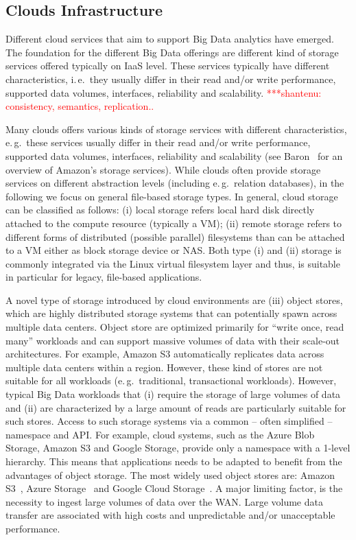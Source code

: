 \documentclass[times]{cpeauth}
\newcommand{\jhanote}[1]{ {\textcolor{red} { ***shantenu: #1 }}}
\newcommand{\jhanote}[1]{}
\begin{document}
\subsection{Clouds Infrastructure}

Different cloud services that aim to support Big Data analytics have
emerged.  The foundation for the different Big Data offerings are
different kind of storage services offered typically on IaaS
level. These services typically have different characteristics,
i.\,e.\ they usually differ in their read and/or write performance,
supported data volumes, interfaces, reliability and scalability.
\jhanote{consistency, semantics, replication..}

Many clouds offers various kinds of storage services with different
characteristics, e.\,g.\ these services usually differ in their read
and/or write performance, supported data volumes, interfaces,
reliability and scalability (see Baron~\cite{baron2010} for an
overview of Amazon's storage services). While clouds often provide
storage services on different abstraction levels (including e.\,g.\
relation databases), in the following we focus on general file-based
storage types. In general, cloud storage can be classified as follows:
(i) local storage refers local hard disk directly attached to the
compute resource (typically a VM); (ii) remote storage refers to
different forms of distributed (possible parallel) filesystems than
can be attached to a VM either as block storage device or NAS. Both
type (i) and (ii) storage is commonly integrated via the Linux virtual
filesystem layer and thus, is suitable in particular for legacy,
file-based applications.

A novel type of storage introduced by cloud environments are (iii)
object stores, which are highly distributed storage systems that can
potentially spawn across multiple data centers. Object store are
optimized primarily for ``write once, read many'' workloads and can
support massive volumes of data with their scale-out
architectures. For example, Amazon S3 automatically replicates data
across multiple data centers within a region. However, these kind of
stores are not suitable for all workloads (e.\,g.\ traditional,
transactional workloads). However, typical Big Data workloads that (i)
require the storage of large volumes of data and (ii) are
characterized by a large amount of reads are particularly suitable for
such stores. Access to such storage systems via a common -- often
simplified -- namespace and API. For example, cloud systems, such as
the Azure Blob Storage, Amazon S3 and Google Storage, provide only a
namespace with a 1-level hierarchy. This means that applications needs
to be adapted to benefit from the advantages of object storage. The
most widely used object stores are: Amazon S3~\cite{amazons3}, Azure
Storage~\cite{azure-blob-storage} and Google Cloud
Storage~\cite{google-storage}. A major limiting factor, is the
necessity to ingest large volumes of data over the WAN. Large volume
data transfer are associated with high costs and unpredictable and/or
unacceptable performance.
\end{document}
